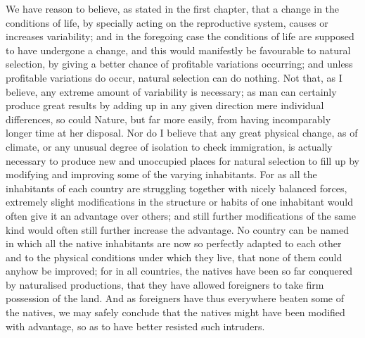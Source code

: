 \indent We have reason to believe, as stated in the first chapter, that a change in the conditions of life, by specially acting on the reproductive system, causes or increases variability; and in the foregoing case the conditions of life are supposed to have undergone a change, and this would manifestly be favourable to natural selection, by giving a better chance of profitable variations occurring; and unless profitable variations do occur, natural selection can do nothing. Not that, as I believe, any extreme amount of variability is necessary; as man can certainly produce great results by adding up in any given direction mere individual differences, so could Nature, but far more easily, from having incomparably longer time at her disposal. Nor do I believe that any great physical change, as of climate, or any unusual degree of isolation to check immigration, is actually necessary to produce new and unoccupied places for natural selection to fill up by modifying and improving some of the varying inhabitants. For as all the inhabitants of each country are struggling together with nicely balanced forces, extremely slight modifications in the structure or habits of one inhabitant would often give it an advantage over others; and still further modifications of the same kind would often still further increase the advantage. No country can be named in which all the native inhabitants are now so perfectly adapted to each other and to the physical conditions under which they live, that none of them could anyhow be improved; for in all countries, the natives have been so far conquered by naturalised productions, that they have allowed foreigners to take firm possession of the land.  And as foreigners have thus everywhere beaten some of the natives, we may safely conclude that the natives might have been modified with advantage, so as to have better resisted such intruders. \\
